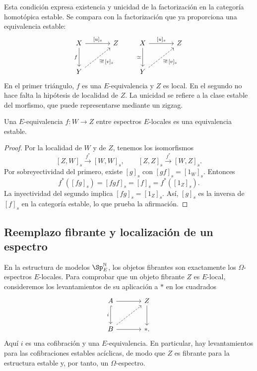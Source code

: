 Esta condición expresa existencia y unicidad de la factorización en la categoría homotópica estable. Se compara con la factorización que ya proporciona una equivalencia estable:
\[
\begin{tikzcd}[column sep=large,row sep=large]
X\arrow[r,"{[u]_s}"]\arrow[d,"f"']&Z\\
Y\arrow[ur,dashed,"{\exists!\,[v]_s}"']&
\end{tikzcd}
\qquad
\begin{tikzcd}[column sep=large,row sep=large]
X\arrow[r,"{[u]_s}"]\arrow[d,"\simeq"']&Z\\
Y\arrow[ur,dashed,"{\exists!\,[v]_s}"']&
\end{tikzcd}
\]
En el primer triángulo, $f$ es una $E$-equivalencia y $Z$ es local. En el segundo no hace falta la hipótesis de localidad de $Z$. La unicidad se refiere a la clase estable del morfismo, que puede representarse mediante un zigzag.

\begin{lema}\label{lema:c21-equivalencia-entre-locales}
Una $E$-equivalencia $f\colon W\to Z$ entre espectros $E$-locales es una equivalencia estable.
\end{lema}
\begin{proof}
Por la localidad de $W$ y de $Z$, tenemos los isomorfismos
\[
[Z,W]_s\xrightarrow{\ f^*\ }[W,W]_s,
\qquad[Z,Z]_s\xrightarrow{\ f^*\ }[W,Z]_s.
\]
Por sobreyectividad del primero, existe $[g]_s$ con $[gf]_s=[1_W]_s$. Entonces
\[
f^*([fg]_s)=[fgf]_s=[f]_s=f^*([1_Z]_s).
\]
La inyectividad del segundo implica $[fg]_s=[1_Z]_s$. Así, $[g]_s$ es la inversa de $[f]_s$ en la categoría estable, lo que prueba la afirmación.
\end{proof}

\subsection{Reemplazo fibrante y localización de un espectro}
En la estructura de modelos $\Sp_E^{\mathbb N}$, los objetos fibrantes son exactamente los $\Omega$-espectros $E$-locales. Para comprobar que un objeto fibrante $Z$ es $E$-local, consideremos los levantamientos de su aplicación a $*$ en los cuadrados
\[
\begin{tikzcd}[column sep=large,row sep=large]
A\arrow[r]\arrow[d,hook,"i"']&Z\arrow[d]\\
B\arrow[r]\arrow[ur,dashed]&*.
\end{tikzcd}
\]
Aquí $i$ es una cofibración y una $E$-equivalencia. En particular, hay levantamientos para las cofibraciones estables acíclicas, de modo que $Z$ es fibrante para la estructura estable y, por tanto, un $\Omega$-espectro.

